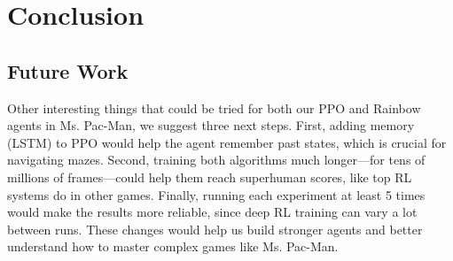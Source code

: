 \documentclass{article}
\begin{document}


\section{Conclusion}


\subsection{Future Work}
Other interesting things that could be tried for both our PPO and Rainbow agents in Ms. Pac-Man, we suggest three next steps. First, adding memory (LSTM) to PPO would help the agent remember past states, which is crucial for navigating mazes. Second, training both algorithms much longer—for tens of millions of frames—could help them reach superhuman scores, like top RL systems do in other games. Finally, running each experiment at least 5 times would make the results more reliable, since deep RL training can vary a lot between runs. These changes would help us build stronger agents and better understand how to master complex games like Ms. Pac-Man.



\end{document}
